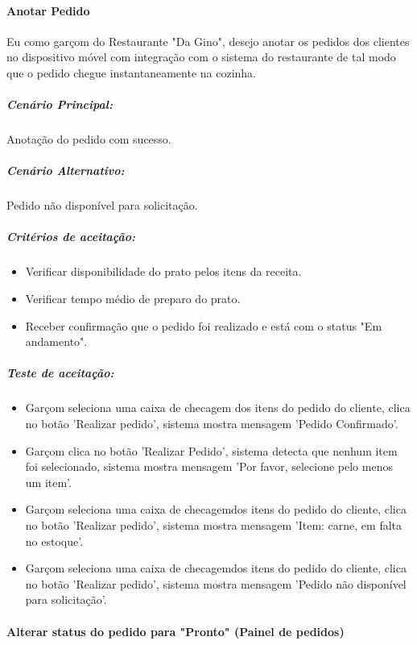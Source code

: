 \paragraph{Anotar Pedido}

Eu como garçom do Restaurante "Da Gino", desejo anotar os pedidos dos clientes no dispositivo móvel com integração com o sistema do restaurante de tal modo que o pedido chegue instantaneamente na cozinha.

\subparagraph{Cenário Principal:}

Anotação do pedido com sucesso.

\subparagraph{Cenário Alternativo:}

Pedido não disponível para solicitação.

\subparagraph{Critérios de aceitação:}

\begin{itemize}
\item Verificar disponibilidade do prato pelos itens da receita.
\item Verificar tempo médio de preparo do prato.
\item Receber confirmação que o pedido foi realizado e está com o status "Em andamento".
\end{itemize}

\subparagraph{Teste de aceitação:}

\begin{itemize}
\item Garçom seleciona uma caixa de checagem dos itens do pedido do cliente, clica no botão 'Realizar pedido', sistema mostra mensagem 'Pedido Confirmado'.
\item Garçom clica no botão 'Realizar Pedido', sistema detecta que nenhum item foi selecionado, sistema mostra mensagem 'Por favor, selecione pelo menos um item'.
\item Garçom seleciona uma caixa de checagemdos itens do pedido do cliente, clica no botão 'Realizar pedido', sistema mostra mensagem 'Item: carne, em falta no estoque'.
\item Garçom seleciona uma caixa de checagemdos itens do pedido do cliente, clica no botão 'Realizar pedido', sistema mostra mensagem 'Pedido não disponível para solicitação'.
\end{itemize}

\paragraph{Alterar status do pedido para "Pronto" (Painel de pedidos)}

